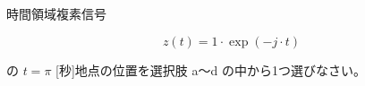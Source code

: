 時間領域複素信号 

\[
z(t) = 1 \cdot \exp(-j \cdot t) 
\]

\medskip
\noindent の $t = \pi$ [秒]地点の位置を選択肢 a〜d の中から1つ選びなさい。
